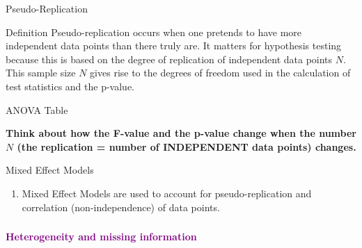 \documentclass{beamer}
\begin{document}
\begin{frame}{Pseudo-Replication}
  \begin{block}{Definition}
    Pseudo-replication occurs when one pretends to have more independent data points than there truly are. It matters for hypothesis testing because this is based on the degree of replication of independent data points \(N\). This sample size \(N\) gives rise to the degrees of freedom used in the calculation of test statistics and the p-value.
  \end{block}
\end{frame}

\begin{frame}{ANOVA Table}

  \vspace{0.5cm}

  \normalsize
  \textbf{Think about how the F-value and the p-value change when the number \(N\) (the replication = number of INDEPENDENT data points) changes.}
\end{frame}

\begin{frame}{Mixed Effect Models}
  \begin{enumerate}
      \item Mixed Effect Models are used to account for pseudo-replication and correlation (non-independence) of data points.
      \end{enumerate}
\end{frame}

\begin{frame}
  \frametitle{}
  \begin{center}
    \huge\textbf{\textcolor{purple}{Heterogeneity and missing information}}
  \end{center}
\end{frame}
\end{document}
